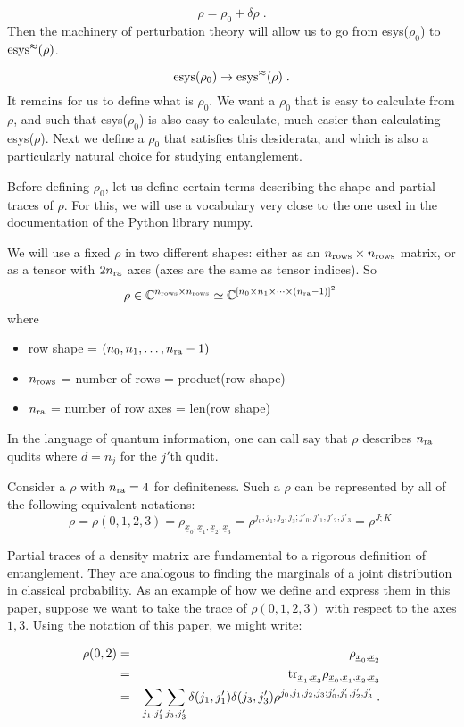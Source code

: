\documentclass[12pt]{article}%
\newcommand{\tr}[0]{{\rm tr }}
\newcommand{\beq}{\begin{equation}}
\newcommand{\eeq}{\end{equation}}
\newcommand{\beqa}{\begin{eqnarray}}
\newcommand{\eeqa}{\end{eqnarray}}
\newcommand{\rarrow}[0]{\rightarrow}
\newcommand{\ul}[1]{\underline{#1}}
\newcommand{\CC}[0]{{ \mathbb{C}} }
\newcommand{\rvx}[0]{{\ul{x}}}
\newcommand{\nra}[0]{{n_{\rm ra}}}
\newcommand{\nr}[0]{{n_{\rm rows}}}
\begin{document}
\beq
\rho = \rho_0 + \delta \rho
\;.
\eeq
Then the machinery of perturbation
theory will allow us to go from
esys($\rho_0$) to ${\rm esys^\approx(\rho)}$.

\beq
{\rm esys}(\rho_0) \rarrow {\rm esys^\approx(\rho)}
\;.
\eeq
It remains for us to define what is $\rho_0$.
We want a $\rho_0$ that
is easy to calculate
from $\rho$,
and such that esys($\rho_0$) is also easy to
calculate, much easier
than calculating esys($\rho$).
Next we define
a $\rho_0$ that satisfies this desiderata, and
which is also a particularly natural
choice for studying entanglement.

Before defining $\rho_0$, let us
define certain terms describing
the shape and partial traces of $\rho$.
For this, we will use a vocabulary
very close to the one used in the
documentation of the Python library numpy.

We will use a fixed $\rho$ in two different shapes:
either as an $\nr\times\nr$ matrix,
or as a tensor with $2\nra$ axes (axes are the same as
tensor indices). So
\beq
\rho \in \CC^{\nr\times\nr}
\simeq \CC^{[n_0\times n_1 \times\cdots\times(\nra-1)]^2}
\;
\eeq
where

\begin{itemize}
\item row shape = $(n_0, n_1, \ldots, \nra-1)$
\item $\nr$ = number of rows = product(row shape)
\item $\nra$ = number of row axes = len(row shape)
\end{itemize}
In the language of quantum information,
one can call say that $\rho$ describes $\nra$
qudits where $d=n_j$ for the $j'$th qudit.

Consider a $\rho$
with $\nra = 4$ for definiteness.
Such a $\rho$ can be represented by all of the following
equivalent notations:
\beq
\rho= \rho(0, 1, 2, 3) =\rho_{\rvx_0, \rvx_1, \rvx_2, \rvx_3}=
\rho^{j_0, j_1, j_2, j_3; j'_0, j'_1, j'_2, j'_3}
=\rho^{J;K}
\;
\eeq

Partial traces
of a density matrix
are fundamental to a rigorous definition
of entanglement. They are analogous to
finding the marginals of a
joint distribution in classical
probability. As an example of how we define
and express them in this paper,
suppose we want to
take the trace of $\rho(0, 1, 2, 3)$
with respect to the axes $1, 3$.
Using the notation of
this paper, we might write:

\beqa
\rho(0,2) &=&\rho_{\rvx_0,\rvx_2}
\\&=&
\tr_{\rvx_1, \rvx_3}\rho_{\rvx_0, \rvx_1, \rvx_2, \rvx_3}
\\&=&\sum_{j_1, j'_1}\sum_{j_3, j'_3}
\delta(j_1, j'_1)
\delta(j_3, j_3') \rho^{j_0, j_1, j_2, j_3; j'_0, j'_1, j'_2, j'_3}
\;.
\eeqa
\end{document}
